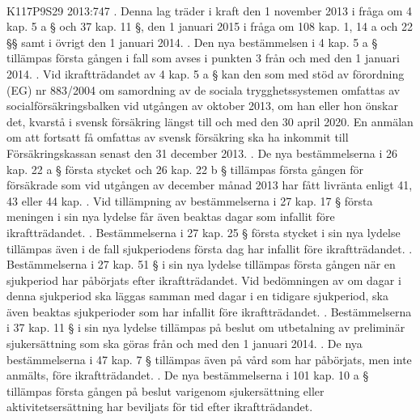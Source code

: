 \documentclass[a4paper,notitlepage,openany,10pt]{book}
\begin{document}
\paragraph*{}
{\tiny K117P9S29}
2013:747
. Denna lag träder i kraft den 1 november 2013 i fråga om 4 kap. 5 a § och 37 kap. 11 §, den 1 januari 2015 i fråga om 108 kap. 1, 14 a och 22 §§ samt i övrigt den 1 januari 2014.
. Den nya bestämmelsen i 4 kap. 5 a § tillämpas första gången i fall som avses i punkten 3 från och med den 1 januari 2014.
. Vid ikraftträdandet av 4 kap. 5 a § kan den som med stöd av förordning (EG) nr 883/2004 om samordning av de sociala trygghetssystemen omfattas av socialförsäkringsbalken vid utgången av oktober 2013, om han eller hon önskar det, kvarstå i svensk försäkring längst till och med den 30 april 2020. En anmälan om att fortsatt få omfattas av svensk försäkring ska ha inkommit till Försäkringskassan senast den 31 december 2013.
. De nya bestämmelserna i 26 kap. 22 a § första stycket och 26 kap. 22 b § tillämpas första gången för försäkrade som vid utgången av december månad 2013 har fått livränta enligt 41, 43 eller 44 kap.
. Vid tillämpning av bestämmelserna i 27 kap. 17 § första meningen i sin nya lydelse får även beaktas dagar som infallit före ikraftträdandet.
. Bestämmelserna i 27 kap. 25 § första stycket i sin nya lydelse tillämpas även i de fall sjukperiodens första dag har infallit före ikraftträdandet.
. Bestämmelserna i 27 kap. 51 § i sin nya lydelse tillämpas första gången när en sjukperiod har påbörjats efter ikraftträdandet. Vid bedömningen av om dagar i denna sjukperiod ska läggas samman med dagar i en tidigare sjukperiod, ska även beaktas sjukperioder som har infallit före ikraftträdandet.
. Bestämmelserna i 37 kap. 11 § i sin nya lydelse tillämpas på beslut om utbetalning av preliminär sjukersättning som ska göras från och med den 1 januari 2014.
. De nya bestämmelserna i 47 kap. 7 § tillämpas även på vård som har påbörjats, men inte anmälts, före ikraftträdandet.
. De nya bestämmelserna i 101 kap. 10 a § tillämpas första gången på beslut varigenom sjukersättning eller aktivitetsersättning har beviljats för tid efter ikraftträdandet.
\end{document}
